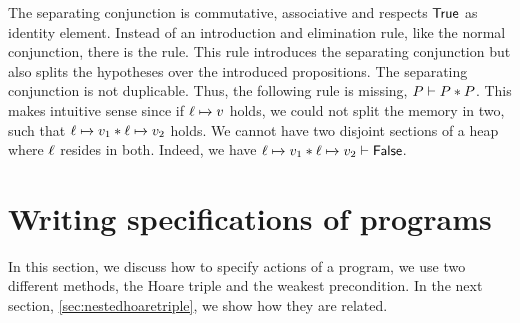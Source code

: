 \documentclass[thesis.tex]{subfiles}
\begin{document}
The separating conjunction is commutative, associative and respects $\textsf{\upshape True}$ as identity element. Instead of an introduction and elimination rule, like the normal conjunction, there is the  rule. This rule introduces the separating conjunction but also splits the hypotheses over the introduced propositions. The separating conjunction is not duplicable. Thus, the following rule is missing, $P \vdash P * P$. This makes intuitive sense since if $\loc\fmapsto\val$ holds, we could not split the memory in two, such that $\loc\fmapsto\val_1 * \loc\fmapsto\val_2$ holds. We cannot have two disjoint sections of a heap where $\ell$ resides in both. Indeed, we have $\loc\fmapsto\val_1 * \loc\fmapsto\val_2 \proves \FALSE$.

\section{Writing specifications of programs}
\label{sec:Hoare}
In this section, we discuss how to specify actions of a program, we use two different methods, the Hoare triple and the weakest precondition. In the next section, \cref{sec:nestedhoaretriple}, we show how they are related.
\end{document}
